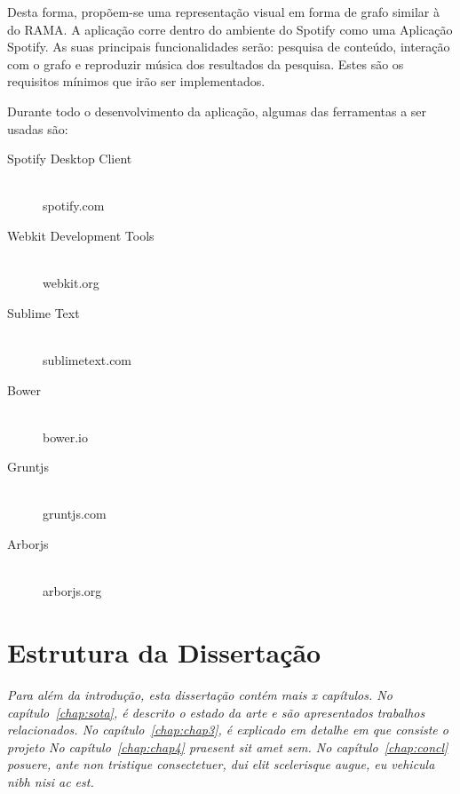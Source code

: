 Desta forma, propõem-se uma representação visual em forma de grafo similar à do RAMA.
A aplicação corre dentro do ambiente do Spotify como uma Aplicação Spotify.
As suas principais funcionalidades serão: pesquisa de conteúdo, interação com o grafo e reproduzir música dos resultados da pesquisa.
Estes são os requisitos mínimos que irão ser implementados.

Durante todo o desenvolvimento da aplicação, algumas das ferramentas a ser usadas são:

\begin{description}
  \item[Spotify Desktop Client] \hfill \\
    spotify.com
  \item[Webkit Development Tools] \hfill \\
    webkit.org
  \item[Sublime Text] \hfill \\
    sublimetext.com
  \item[Bower] \hfill \\
    bower.io
  \item[Gruntjs] \hfill \\
    gruntjs.com
  \item[Arborjs] \hfill \\
    arborjs.org
\end{description}



\section{Estrutura da Dissertação} \label{sec:struct}

\emph{Para além da introdução, esta dissertação contém mais x capítulos.
No capítulo~\ref{chap:sota}, é descrito o estado da arte e são
apresentados trabalhos relacionados.
No capítulo~\ref{chap:chap3}, é explicado em detalhe em que consiste o projeto
No capítulo~\ref{chap:chap4} praesent sit amet sem. 
No capítulo~\ref{chap:concl}  posuere, ante non tristique
consectetuer, dui elit scelerisque augue, eu vehicula nibh nisi ac
est. 
}